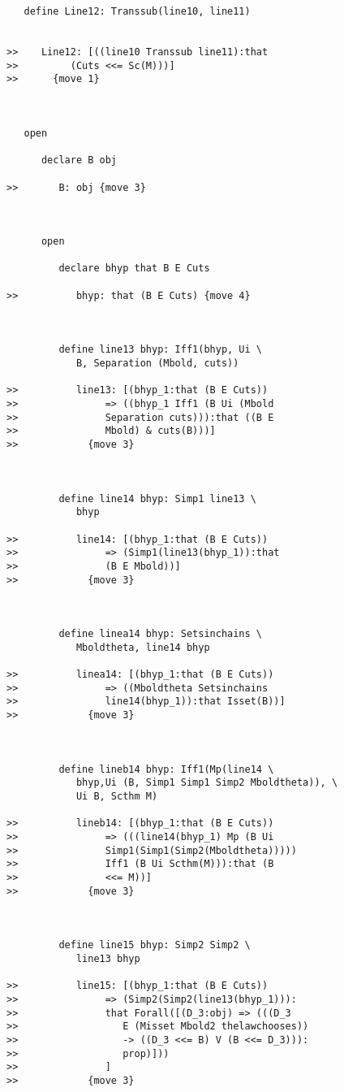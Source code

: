 \documentclass[12pt]{article}
\begin{document}
\begin{verbatim}
   define Line12: Transsub(line10, line11)


>>    Line12: [((line10 Transsub line11):that
>>         (Cuts <<= Sc(M)))]
>>      {move 1}



   open

      declare B obj

>>       B: obj {move 3}



      open

         declare bhyp that B E Cuts

>>          bhyp: that (B E Cuts) {move 4}



         define line13 bhyp: Iff1(bhyp, Ui \
            B, Separation (Mbold, cuts))

>>          line13: [(bhyp_1:that (B E Cuts))
>>               => ((bhyp_1 Iff1 (B Ui (Mbold
>>               Separation cuts))):that ((B E
>>               Mbold) & cuts(B)))]
>>            {move 3}



         define line14 bhyp: Simp1 line13 \
            bhyp

>>          line14: [(bhyp_1:that (B E Cuts))
>>               => (Simp1(line13(bhyp_1)):that
>>               (B E Mbold))]
>>            {move 3}



         define linea14 bhyp: Setsinchains \
            Mboldtheta, line14 bhyp

>>          linea14: [(bhyp_1:that (B E Cuts))
>>               => ((Mboldtheta Setsinchains
>>               line14(bhyp_1)):that Isset(B))]
>>            {move 3}



         define lineb14 bhyp: Iff1(Mp(line14 \
            bhyp,Ui (B, Simp1 Simp1 Simp2 Mboldtheta)), \
            Ui B, Scthm M)

>>          lineb14: [(bhyp_1:that (B E Cuts))
>>               => (((line14(bhyp_1) Mp (B Ui
>>               Simp1(Simp1(Simp2(Mboldtheta)))))
>>               Iff1 (B Ui Scthm(M))):that (B
>>               <<= M))]
>>            {move 3}



         define line15 bhyp: Simp2 Simp2 \
            line13 bhyp

>>          line15: [(bhyp_1:that (B E Cuts))
>>               => (Simp2(Simp2(line13(bhyp_1))):
>>               that Forall([(D_3:obj) => (((D_3
>>                  E (Misset Mbold2 thelawchooses))
>>                  -> ((D_3 <<= B) V (B <<= D_3))):
>>                  prop)]))
>>               ]
>>            {move 3}




\end{verbatim}
\end{document}
